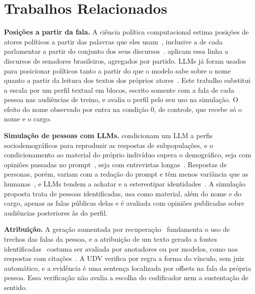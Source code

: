 \section{Trabalhos Relacionados}
\label{sec:relacionados}

\textbf{Posições a partir da fala.} A ciência política computacional estima posições de atores
políticos a partir das palavras que eles usam~\citep{laver2003extracting}, inclusive a de cada
parlamentar a partir do conjunto dos seus discursos~\citep{lauderdale2016measuring}.
\citet{izumi2021government} aplicam essa linha a discursos de senadores brasileiros, agregados por
partido. LLMs já foram usados para posicionar políticos tanto a partir do que o modelo sabe sobre o
nome~\citep{wu2023large} quanto a partir da leitura dos textos dos próprios
atores~\citep{lemens2025positioning}. Este trabalho substitui a escala por um perfil textual em
blocos, escrito somente com a fala de cada pessoa nas audiências de treino, e avalia o perfil pelo seu
uso na simulação. O efeito do nome observado por \citet{wu2023large} entra na condição 0, de
controle, que recebe só o nome e o cargo.

\textbf{Simulação de pessoas com LLMs.} \citet{argyle2023outofone} condicionam um LLM a perfis
sociodemográficos para reproduzir as respostas de subpopulações, e o condicionamento ao material do
próprio indivíduo supera o demográfico, seja com opiniões passadas no
prompt~\citep{hwang2023aligning}, seja com entrevistas longas~\citep{park2026llm}. Respostas de
personas, porém, variam com a redação do prompt e têm menos variância que as
humanas~\citep{bisbee2024synthetic}, e LLMs tendem a achatar e a estereotipar
identidades~\citep{wang2025large}. A simulação proposta trata de pessoas identificadas, usa como
material, além do nome e do cargo, apenas as falas públicas delas e é avaliada com opiniões
publicadas sobre audiências posteriores às do perfil.

\textbf{Atribuição.} A geração aumentada por recuperação~\citep{lewis2020rag} fundamenta o uso de
trechos das falas da pessoa, e a atribuição de um texto gerado a fontes
identificadas~\citep{rashkin2023measuring} costuma ser avaliada por anotadores ou por modelos, como
nas respostas com citações~\citep{gao2023enabling}. A UDV verifica por regra a forma do vínculo, sem
juiz automático, e a evidência é uma sentença localizada por offsets na fala da própria pessoa. Essa
verificação não avalia a escolha do codificador nem a sustentação de sentido.
